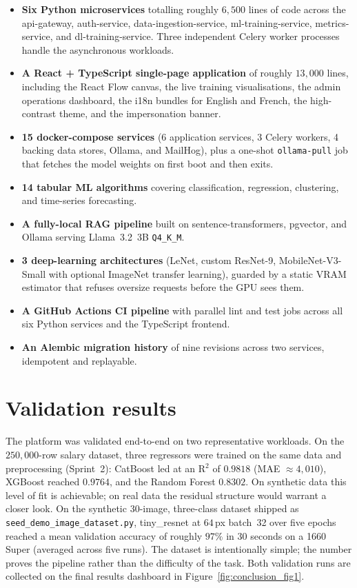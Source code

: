 \documentclass[12pt, a4paper, oneside]{report}
\begin{document}
\begin{itemize}
    \item \textbf{Six Python microservices} totalling roughly
        $6{,}500$ lines of code across the api-gateway,
        auth-service, data-ingestion-service, ml-training-service,
        metrics-service, and dl-training-service. Three independent
        Celery worker processes handle the asynchronous workloads.
    \item \textbf{A React + TypeScript single-page application} of
        roughly $13{,}000$ lines, including the React Flow canvas,
        the live training visualisations, the admin operations
        dashboard, the i18n bundles for English and French, the
        high-contrast theme, and the impersonation banner.
    \item \textbf{15 docker-compose services} (6 application
        services, 3 Celery workers, 4 backing data stores, Ollama, and
        MailHog), plus a one-shot \texttt{ollama-pull} job that fetches
        the model weights on first boot and then exits.
    \item \textbf{14 tabular ML algorithms} covering classification,
        regression, clustering, and time-series forecasting.
    \item \textbf{A fully-local RAG pipeline} built on
        sentence-transformers, pgvector, and Ollama serving
        Llama~3.2~3B \texttt{Q4\_K\_M}.
    \item \textbf{3 deep-learning architectures} (LeNet, custom
        ResNet-9, MobileNet-V3-Small with optional ImageNet transfer
        learning), guarded by a static VRAM estimator that refuses
        oversize requests before the GPU sees them.
    \item \textbf{A GitHub Actions CI pipeline} with parallel lint
        and test jobs across all six Python services and the
        TypeScript frontend.
    \item \textbf{An Alembic migration history} of nine revisions
        across two services, idempotent and replayable.
\end{itemize}

\section*{Validation results}

The platform was validated end-to-end on two representative
workloads. On the $250{,}000$-row salary dataset, three regressors were
trained on the same data and preprocessing (Sprint~2): CatBoost led at
an R$^2$ of $0.9818$ (MAE $\approx 4{,}010$), XGBoost reached $0.9764$,
and the Random Forest $0.8302$. On synthetic data this level of fit is
achievable; on real data the residual structure would warrant a closer
look. On the synthetic 30-image,
three-class dataset shipped as \texttt{seed\_demo\_image\_dataset.py},
tiny\_resnet at $64$\,px batch~32 over five epochs reached a mean
validation accuracy of roughly $97\%$ in $30$ seconds on a 1660
Super (averaged across five runs). The dataset is intentionally
simple; the number proves the pipeline rather than the difficulty
of the task. Both validation runs are collected on the final results
dashboard in Figure~\ref{fig:conclusion_fig1}.
\end{document}
